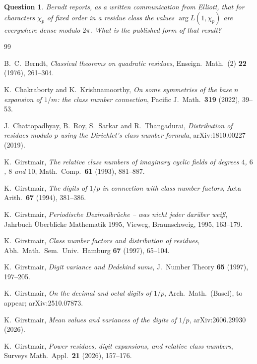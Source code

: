 \documentclass[11pt,reqno]{amsart}
\theoremstyle{plain}
\newtheorem{question}[theorem]{Question}
\theoremstyle{definition}
\begin{document}
\begin{question}
Berndt \cite[\S14]{Berndt} reports, as a written communication from Elliott, that for characters $\chi_p$ of fixed order
in a residue class the values $\arg L(1,\chi_p)$ are everywhere dense modulo $2\pi$. What is the published form of that
result?
\end{question}

\begin{thebibliography}{99}

 B.~C.~Berndt, \emph{Classical theorems on quadratic residues}, Enseign.\ Math.\ (2) \textbf{22} (1976),
261--304.

 K.~Chakraborty and K.~Krishnamoorthy, \emph{On some symmetries of the base $n$ expansion of $1/m$: the class
number connection}, Pacific J.\ Math.\ \textbf{319} (2022), 39--53.

 J.~Chattopadhyay, B.~Roy, S.~Sarkar and R.~Thangadurai, \emph{Distribution of residues modulo $p$ using the
Dirichlet's class number formula}, arXiv:1810.00227 (2019).

 K.~Girstmair, \emph{The relative class numbers of imaginary cyclic fields of degrees $4$, $6$, $8$ and
$10$}, Math.\ Comp.\ \textbf{61} (1993), 881--887.

 K.~Girstmair, \emph{The digits of $1/p$ in connection with class number factors}, Acta Arith.\ \textbf{67}
(1994), 381--386.

 K.~Girstmair, \emph{Periodische Dezimalbr\"uche -- was nicht jeder dar\"uber wei\ss}, Jahrbuch \"Uberblicke
Mathematik 1995, Vieweg, Braunschweig, 1995, 163--179.

 K.~Girstmair, \emph{Class number factors and distribution of residues}, Abh.\ Math.\ Sem.\ Univ.\ Hamburg
\textbf{67} (1997), 65--104.

 K.~Girstmair, \emph{Digit variance and Dedekind sums}, J.\ Number Theory \textbf{65} (1997), 197--205.

 K.~Girstmair, \emph{On the decimal and octal digits of $1/p$}, Arch.\ Math.\ (Basel), to appear;
arXiv:2510.07873.

 K.~Girstmair, \emph{Mean values and variances of the digits of $1/p$}, arXiv:2606.29930 (2026).

 K.~Girstmair, \emph{Power residues, digit expansions, and relative class numbers}, Surveys Math.\ Appl.\
\textbf{21} (2026), 157--176.


\end{thebibliography}
\end{document}
